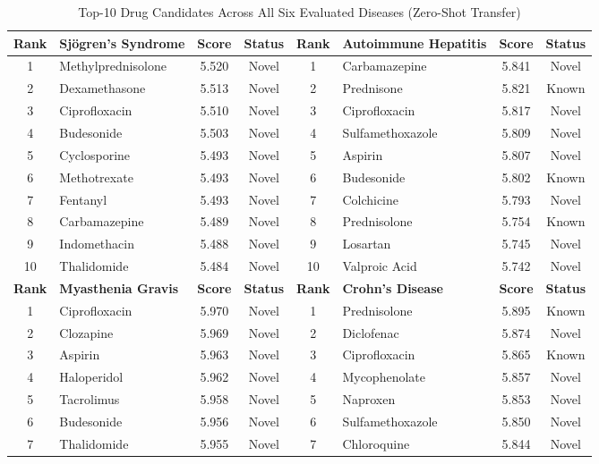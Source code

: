 \documentclass[conference]{IEEEtran}
\begin{document}
\begin{table}[!t]
\caption{Top-10 Drug Candidates Across All Six Evaluated Diseases (Zero-Shot Transfer)}
\label{tab:drug_summary}
\centering
\footnotesize
\renewcommand{\arraystretch}{1.3}
\begin{tabular}{clcc|clcc}
\toprule
\textbf{Rank} & \textbf{Sj\"{o}gren's Syndrome} & \textbf{Score} & \textbf{Status} & \textbf{Rank} & \textbf{Autoimmune Hepatitis} & \textbf{Score} & \textbf{Status} \\
\midrule
1 & Methylprednisolone & 5.520 & Novel & 1 & Carbamazepine & 5.841 & Novel \\
2 & Dexamethasone & 5.513 & Novel & 2 & Prednisone & 5.821 & Known \\
3 & Ciprofloxacin & 5.510 & Novel & 3 & Ciprofloxacin & 5.817 & Novel \\
4 & Budesonide & 5.503 & Novel & 4 & Sulfamethoxazole & 5.809 & Novel \\
5 & Cyclosporine & 5.493 & Novel & 5 & Aspirin & 5.807 & Novel \\
6 & Methotrexate & 5.493 & Novel & 6 & Budesonide & 5.802 & Known \\
7 & Fentanyl & 5.493 & Novel & 7 & Colchicine & 5.793 & Novel \\
8 & Carbamazepine & 5.489 & Novel & 8 & Prednisolone & 5.754 & Known \\
9 & Indomethacin & 5.488 & Novel & 9 & Losartan & 5.745 & Novel \\
10 & Thalidomide & 5.484 & Novel & 10 & Valproic Acid & 5.742 & Novel \\
\midrule
\textbf{Rank} & \textbf{Myasthenia Gravis} & \textbf{Score} & \textbf{Status} & \textbf{Rank} & \textbf{Crohn's Disease} & \textbf{Score} & \textbf{Status} \\
\midrule
1 & Ciprofloxacin & 5.970 & Novel & 1 & Prednisolone & 5.895 & Known \\
2 & Clozapine & 5.969 & Novel & 2 & Diclofenac & 5.874 & Novel \\
3 & Aspirin & 5.963 & Novel & 3 & Ciprofloxacin & 5.865 & Known \\
4 & Haloperidol & 5.962 & Novel & 4 & Mycophenolate & 5.857 & Novel \\
5 & Tacrolimus & 5.958 & Novel & 5 & Naproxen & 5.853 & Novel \\
6 & Budesonide & 5.956 & Novel & 6 & Sulfamethoxazole & 5.850 & Novel \\
7 & Thalidomide & 5.955 & Novel & 7 & Chloroquine & 5.844 & Novel \\

\end{tabular}
\end{table}
\end{document}
